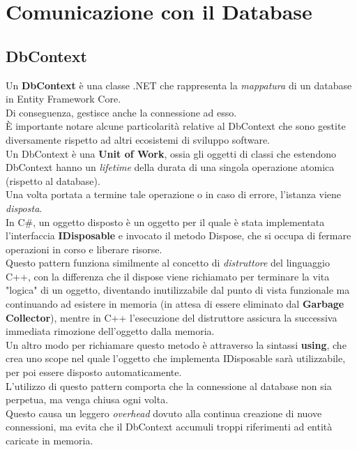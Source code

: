\documentclass[\main/tesi.tex]{subfiles}
\begin{document}
\section{Comunicazione con il Database}

\subsection{DbContext}

Un \textbf{DbContext} è una classe .NET che rappresenta la \textit{mappatura} di un database in Entity Framework Core.\\
Di conseguenza, gestisce anche la connessione ad esso.\\
È importante notare alcune particolarità relative al DbContext che sono gestite diversamente rispetto ad altri ecosistemi di sviluppo software.\\
Un DbContext è una \textbf{Unit of Work}, ossia gli oggetti di classi che estendono DbContext hanno un \textit{lifetime} della durata di una singola operazione atomica (rispetto al database).\\
Una volta portata a termine tale operazione o in caso di errore, l'istanza viene \textit{disposta}.\\
In C\#, un oggetto disposto è un oggetto per il quale è stata implementata l'interfaccia \textbf{IDisposable} e invocato il metodo Dispose, che si occupa di fermare operazioni in corso e liberare risorse.\\
Questo pattern funziona similmente al concetto di \textit{distruttore} del linguaggio C++, con la differenza che il dispose viene richiamato per terminare la vita "logica" di un oggetto, diventando inutilizzabile dal punto di vista funzionale ma continuando ad esistere in memoria (in attesa di essere eliminato dal \textbf{Garbage Collector}), mentre in C++ l'esecuzione del distruttore assicura la successiva immediata rimozione dell'oggetto dalla memoria.\\
Un altro modo per richiamare questo metodo è attraverso la sintassi \textbf{using}, che crea uno scope nel quale l'oggetto che implementa IDisposable sarà utilizzabile, per poi essere disposto automaticamente.\\
L'utilizzo di questo pattern comporta che la connessione al database non sia perpetua, ma venga chiusa ogni volta.\\
Questo causa un leggero \textit{overhead} dovuto alla continua creazione di nuove connessioni, ma evita che il DbContext accumuli troppi riferimenti ad entità caricate in memoria.\\
\end{document}

